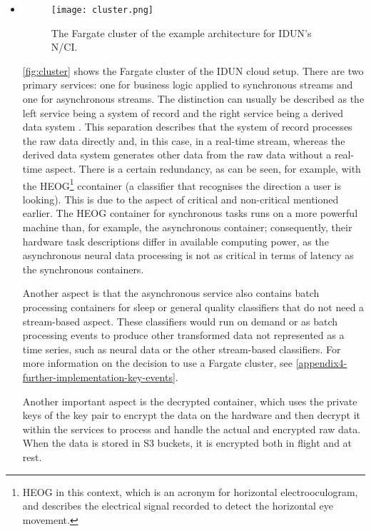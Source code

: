 \begin{itemize}

  \item \begin{figure}[!ht]
          \centering
          \texttt{[image: cluster.png]}
          \caption{The Fargate cluster of the example architecture for IDUN's N/CI.}
          \label{fig:cluster}
        \end{figure}

        \autoref{fig:cluster} shows the Fargate cluster of the IDUN cloud setup. There are two primary services: one for business logic applied to synchronous streams and one for asynchronous streams. The distinction can usually be described as the left service being a system of record and the right service being a derived data system \citep{kleppmann_designing_2017}. This separation describes that the system of record processes the raw data directly and, in this case, in a real-time stream, whereas the derived data system generates other data from the raw data without a real-time aspect. There is a certain redundancy, as can be seen, for example, with the HEOG\footnote{HEOG in this context, which is an acronym for horizontal electrooculogram, and describes the electrical signal recorded to detect the horizontal eye movement.} ccontainer (a classifier that recognises the direction a user is looking). This is due to the aspect of critical and non-critical mentioned earlier. The HEOG container for synchronous tasks runs on a more powerful machine than, for example, the asynchronous container; consequently, their hardware task descriptions differ in available computing power, as the asynchronous neural data processing is not as critical in terms of latency as the synchronous containers.

        Another aspect is that the asynchronous service also contains batch processing containers for sleep or general quality classifiers that do not need a stream-based aspect. These classifiers would run on demand or as batch processing events to produce other transformed data not represented as a time series, such as neural data or the other stream-based classifiers. For more information on the decision to use a Fargate cluster, see \autoref{appendix4-further-implementation-key-events}.

        Another important aspect is the decrypted container, which uses the private keys of the key pair to encrypt the data on the hardware and then decrypt it within the services to process and handle the actual and encrypted raw data. When the data is stored in S3 buckets, it is encrypted both in flight and at rest.


\end{itemize}

